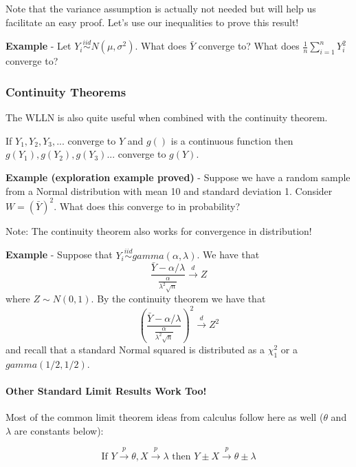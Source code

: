 \documentclass[
]{article}
\providecommand{\tightlist}{%
  \setlength{\itemsep}{0pt}\setlength{\parskip}{0pt}}
\begin{document}
Note that the variance assumption is actually not needed but will help
us facilitate an easy proof. Let's use our inequalities to prove this
result!

\textbf{Example} - Let \(Y_i\stackrel{iid}{\sim}N(\mu, \sigma^2)\). What
does \(\bar{Y}\) converge to? What does
\(\frac{1}{n}\sum_{i=1}^{n}Y_i^2\) converge to?

\hypertarget{continuity-theorems}{%
\subsubsection{Continuity Theorems}\label{continuity-theorems}}

The WLLN is also quite useful when combined with the continuity theorem.

\begin{description}
\tightlist
\item[Continuity Theorem]
If \(Y_1,Y_2,Y_3,...\) converge to \(Y\) and \(g()\) is a continuous
function then \(g(Y_1),g(Y_2),g(Y_3)...\) converge to \(g(Y)\).
\end{description}

\textbf{Example (exploration example proved)} - Suppose we have a random
sample from a Normal distribution with mean 10 and standard deviation 1.
Consider \(W = (\bar{Y})^2\). What does this converge to in probability?

Note: The continuity theorem also works for convergence in distribution!

\textbf{Example} - Suppose that
\(Y_i\stackrel{iid}\sim gamma(\alpha, \lambda)\). We have that
\[\frac{\bar{Y}-\alpha/\lambda}{\frac{\alpha}{\lambda^2\sqrt{n}}}\stackrel{d}\rightarrow Z\]
where \(Z\sim N(0,1)\). By the continuity theorem we have that
\[\left(\frac{\bar{Y}-\alpha/\lambda}{\frac{\alpha}{\lambda^2\sqrt{n}}}\right)^2\stackrel{d}\rightarrow Z^2\]
and recall that a standard Normal squared is distributed as a
\(\chi^2_1\) or a \(gamma(1/2, 1/2)\).

\hypertarget{other-standard-limit-results-work-too}{%
\paragraph{Other Standard Limit Results Work
Too!}\label{other-standard-limit-results-work-too}}

Most of the common limit theorem ideas from calculus follow here as well
(\(\theta\) and \(\lambda\) are constants below):

\[\mbox{If }Y\stackrel{p}{\rightarrow}\theta, X\stackrel{p}{\rightarrow}\lambda\mbox{ then }Y\pm X\stackrel{p}{\rightarrow}\theta\pm\lambda\]
\end{document}
